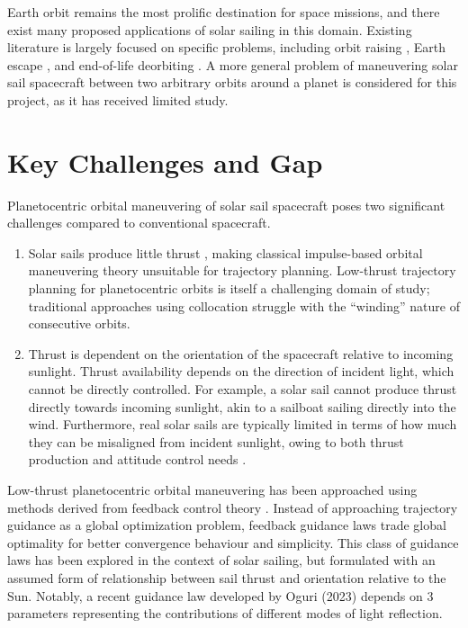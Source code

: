 Earth orbit remains the most prolific destination for space missions, and there exist many proposed applications of solar sailing in this domain. Existing literature is largely focused on specific problems, including orbit raising \cite{fieseler1998method}, Earth escape \cite{coverstone2003technique}, and end-of-life deorbiting \cite{lappas2011deorbitsail}. A more general problem of maneuvering solar sail spacecraft between two arbitrary orbits around a planet is considered for this project, as it has received limited study.

\section{Key Challenges and Gap}
Planetocentric orbital maneuvering of solar sail spacecraft poses two significant challenges compared to conventional spacecraft.
\begin{enumerate}
  \item Solar sails produce little thrust \cite{mcinnes}, making classical impulse-based orbital maneuvering theory unsuitable for trajectory planning. Low-thrust trajectory planning for planetocentric orbits is itself a challenging domain of study; traditional approaches using collocation struggle with the ``winding'' nature of consecutive orbits.
  \item Thrust is dependent on the orientation of the spacecraft relative to incoming sunlight. Thrust availability depends on the direction of incident light, which cannot be directly controlled. For example, a solar sail cannot produce thrust directly towards incoming sunlight, akin to a sailboat sailing directly into the wind. Furthermore, real solar sails are typically limited in terms of how much they can be misaligned from incident sunlight, owing to both thrust production and attitude control needs \cite{mcinnes}.
\end{enumerate}

Low-thrust planetocentric orbital maneuvering has been approached using methods derived from feedback control theory \cite{ilgen1994low, petropoulos2004low, vargaperez2016, sanjeev2023}. Instead of approaching trajectory guidance as a global optimization problem, feedback guidance laws trade global optimality for better convergence behaviour and simplicity. This class of guidance laws has been explored in the context of solar sailing, but formulated with an assumed form of relationship between sail thrust and orientation relative to the Sun. Notably, a recent guidance law developed by Oguri (2023) \cite{oguri2023solar} depends on 3 parameters representing the contributions of different modes of light reflection.

